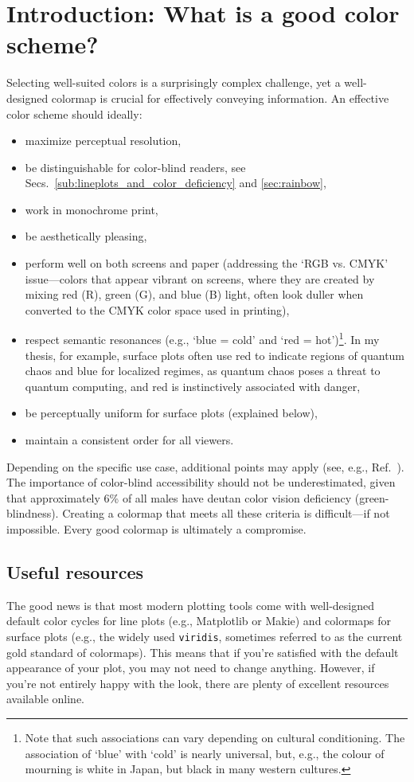 \section{Introduction: What is a good color scheme?}
Selecting well-suited colors is a surprisingly complex challenge, yet a well-designed colormap is crucial for effectively conveying information. An effective color scheme should ideally:
\begin{itemize}
	\item maximize perceptual resolution,
    \item be distinguishable for color-blind readers, see Secs.~\ref{sub:lineplots_and_color_deficiency} and \ref{sec:rainbow},
    \item work in monochrome print,
    \item be aesthetically pleasing,
    \item perform well on both screens and paper (addressing the `RGB vs. CMYK' issue---colors that appear vibrant on screens, where they are created by mixing red (R), green (G), and blue (B) light, often look duller when converted to the CMYK color space used in printing),
    \item respect semantic resonances\cite{linSelectingSemanticallyResonantColors2013} (e.g., `blue = cold' and `red = hot')\footnote{Note that such associations can vary depending on cultural conditioning. The association of `blue' with `cold' is nearly universal, but, e.g., the colour of mourning is white in Japan, but black in many western cultures.}. In my thesis, for example, surface plots often use red to indicate regions of quantum chaos and blue for localized regimes, as quantum chaos poses a threat to quantum computing, and red is instinctively associated with danger,
    \item be perceptually uniform for surface plots (explained below),
    \item maintain a consistent order for all viewers.
\end{itemize}

Depending on the specific use case, additional points may apply (see, e.g., Ref.~\cite{moreland2009}). The importance of color-blind accessibility should not be underestimated, given that approximately 6\% of all males have deutan color vision deficiency (green-blindness).
Creating a colormap that meets all these criteria is difficult---if not impossible. Every good colormap is ultimately a compromise.

\subsection{Useful resources}
The good news is that most modern plotting tools come with well-designed default color cycles for line plots (e.g., Matplotlib or Makie) and colormaps for surface plots (e.g., the widely used \verb|viridis|, sometimes referred to as the current gold standard of colormaps). This means that if you're satisfied with the default appearance of your plot, you may not need to change anything. However, if you're not entirely happy with the look, there are plenty of excellent resources available online.

